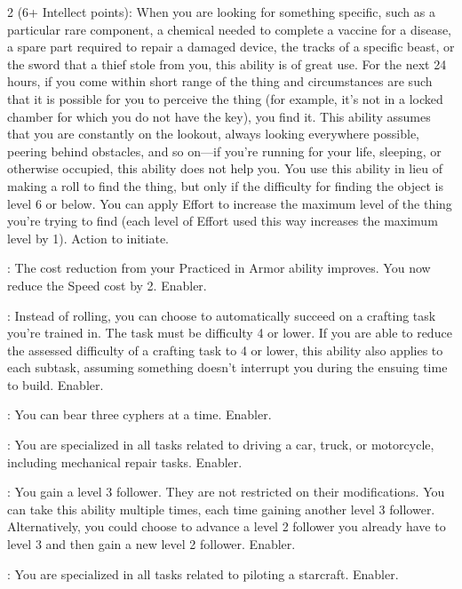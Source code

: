 \begin{multicols}{2}
 (6+ Intellect points): When you are looking for something specific, such as a particular rare component, a chemical needed to complete a vaccine for a disease, a spare part required to repair a damaged device, the tracks of a specific beast, or the sword that a thief stole from you, this ability is of great use. For the next 24 hours, if you come within short range of the thing and circumstances are such that it is possible for you to perceive the thing (for example, it’s not in a locked chamber for which you do not have the key), you find it. This ability assumes that you are constantly on the lookout, always looking everywhere possible, peering behind obstacles, and so on—if you’re running for your life, sleeping, or otherwise occupied, this ability does not help you. You use this ability in lieu of making a roll to find the thing, but only if the difficulty for finding the object is level 6 or below. You can apply Effort to increase the maximum level of the thing you’re trying to find (each level of Effort used this way increases the maximum level by 1). Action to initiate.
 
: The cost reduction from your Practiced in Armor ability improves. You now reduce the Speed cost by 2. Enabler. 
 
: Instead of rolling, you can choose to automatically succeed on a crafting task you’re trained in. The task must be difficulty 4 or lower. If you are able to reduce the assessed difficulty of a crafting task to 4 or lower, this ability also applies to each subtask, assuming something doesn’t interrupt you during the ensuing time to build. Enabler. 
 
: You can bear three cyphers at a time. Enabler. 
 
: You are specialized in all tasks related to driving a car, truck, or motorcycle, including mechanical repair tasks. Enabler. 
 
: You gain a level 3 follower. They are not restricted on their modifications. You can take this ability multiple times, each time gaining another level 3 follower. Alternatively, you could choose to advance a level 2 follower you already have to level 3 and then gain a new level 2 follower. Enabler. 
 
: You are specialized in all tasks related to piloting a starcraft. Enabler. 
 

\end{multicols}
